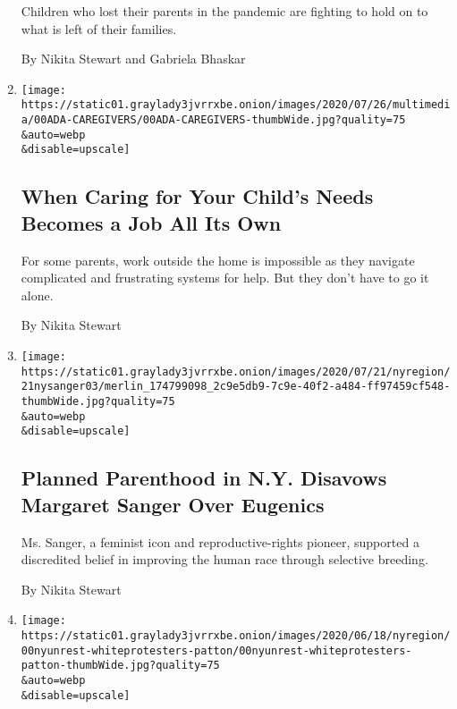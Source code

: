 \begin{enumerate}
  Children who lost their parents in the pandemic are fighting to hold
  on to what is left of their families.

  By Nikita Stewart and Gabriela Bhaskar
\item
  \href{/2020/07/24/us/children-disabilities-parenting-poverty-assistance.html}{}

  \texttt{[image: https://static01.graylady3jvrrxbe.onion/images/2020/07/26/multimedia/00ADA-CAREGIVERS/00ADA-CAREGIVERS-thumbWide.jpg?quality=75\\\&auto=webp\\\&disable=upscale]}

  \hypertarget{when-caring-for-your-childs-needs-becomes-a-job-all-its-own}{%
  \subsection{When Caring for Your Child's Needs Becomes a Job All Its
  Own}\label{when-caring-for-your-childs-needs-becomes-a-job-all-its-own}}

  For some parents, work outside the home is impossible as they navigate
  complicated and frustrating systems for help. But they don't have to
  go it alone.

  By Nikita Stewart
\item
  \href{/2020/07/21/nyregion/planned-parenthood-margaret-sanger-eugenics.html}{}

  \texttt{[image: https://static01.graylady3jvrrxbe.onion/images/2020/07/21/nyregion/21nysanger03/merlin\_174799098\_2c9e5db9-7c9e-40f2-a484-ff97459cf548-thumbWide.jpg?quality=75\\\&auto=webp\\\&disable=upscale]}

  \hypertarget{planned-parenthood-in-ny-disavows-margaret-sanger-over-eugenics}{%
  \subsection{Planned Parenthood in N.Y. Disavows Margaret Sanger Over
  Eugenics}\label{planned-parenthood-in-ny-disavows-margaret-sanger-over-eugenics}}

  Ms. Sanger, a feminist icon and reproductive-rights pioneer, supported
  a discredited belief in improving the human race through selective
  breeding.

  By Nikita Stewart
\item
  \href{/2020/06/26/nyregion/black-lives-matter-white-people-protesters.html}{}

  \texttt{[image: https://static01.graylady3jvrrxbe.onion/images/2020/06/18/nyregion/00nyunrest-whiteprotesters-patton/00nyunrest-whiteprotesters-patton-thumbWide.jpg?quality=75\\\&auto=webp\\\&disable=upscale]}


\end{enumerate}
